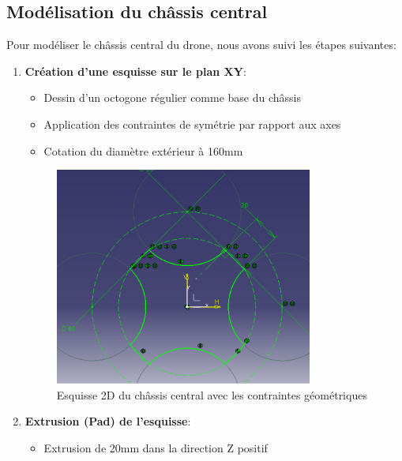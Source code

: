 \documentclass[a4paper,12pt]{report}
\begin{document}
\subsection{Modélisation du châssis central}
Pour modéliser le châssis central du drone, nous avons suivi les étapes suivantes:
\begin{enumerate}
    \item \textbf{Création d'une esquisse sur le plan XY}:
    \begin{itemize}
        \item Dessin d'un octogone régulier comme base du châssis
        \item Application des contraintes de symétrie par rapport aux axes
        \item Cotation du diamètre extérieur à 160mm
    \end{itemize}
    
    \begin{figure}[H]
        \centering
        \includegraphics[width=0.8\textwidth]{images/esquisse_chassis_central.png}
        \caption{Esquisse 2D du châssis central avec les contraintes géométriques}
        \label{fig:esquisse_chassis}
    \end{figure}
    
    \item \textbf{Extrusion (Pad) de l'esquisse}:
    \begin{itemize}
        \item Extrusion de 20mm dans la direction Z positif
    \end{itemize}
    

\end{enumerate}
\end{document}
